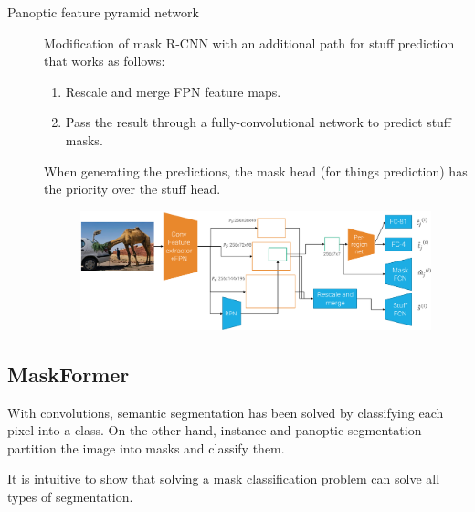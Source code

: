 \begin{description}
    \item[Panoptic feature pyramid network] 
        Modification of mask R-CNN with an additional path for stuff prediction that works as follows:
        \begin{enumerate}
            \item Rescale and merge FPN feature maps.
            \item Pass the result through a fully-convolutional network to predict stuff masks.
        \end{enumerate}

        When generating the predictions, the mask head (for things prediction) has the priority over the stuff head.

        \begin{figure}[H]
            \centering
            \includegraphics[width=0.85\linewidth]{./img/_panoptic_fpn.pdf}
        \end{figure}
\end{description}


\subsection{MaskFormer}

\begin{remark}
    With convolutions, semantic segmentation has been solved by classifying each pixel into a class. On the other hand, instance and panoptic segmentation partition the image into masks and classify them.

    It is intuitive to show that solving a mask classification problem can solve all types of segmentation.
\end{remark}

